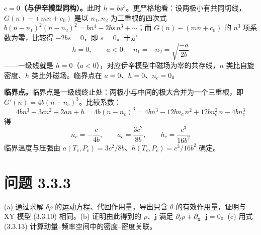 \textbf{$c=0$（与伊辛模型同构）。}此时 $h=bs^{3}$。更严格地看：设两极小有共同切线，$G(n)-(mn+c_0)$ 是以 $n_1,n_2$ 为二重根的四次式 $b(n-n_1)^{2}(n-n_2)^{2}=bn^{4}-2bs\,n^{3}+\cdots$；而 $G(n)-(mn+c_0)$ 的 $n^{3}$ 项系数为零，比较得 $-2bs=0$，即 $s=0$。于是
\begin{equation*}
h=0,\qquad a<0:\quad n_1=-n_2=\sqrt{\frac{-a}{2b}}
\end{equation*}
——一级线就是 $h=0$（$a<0$），对应伊辛模型中磁场为零的共存线，$n$ 类比自旋密度、$h$ 类比外磁场。临界点在 $a=0$、$h=0$、$n_c=0$。

\textbf{临界点。}临界点是一级线终止处：两极小与中间的极大合并为一个三重根，即 $G'(n)=4b(n-n_c)^{3}$。比较系数：
\begin{equation*}
4bn^{3}+3cn^{2}+2an+h=4b(n-n_c)^{3}
=4bn^{3}-12bn_c\,n^{2}+12bn_c^{2}\,n-4bn_c^{3}
\end{equation*}
得
\begin{equation*}
\boxed{\;n_c=-\frac{c}{4b},\qquad
a_c=\frac{3c^{2}}{8b},\qquad
h_c=\frac{c^{3}}{16b^{2}}\;}
\end{equation*}
临界温度与压强由 $a(T_c,P_c)=3c^{2}/8b$、$h(T_c,P_c)=c^{3}/16b^{2}$ 确定。

\section*{问题 3.3.3}
\begin{problem}
(a) 通过求解 $\delta\rho$ 的运动方程、代回作用量，导出只含 $\theta$ 的有效作用量，证明与 XY 模型 (3.3.10) 相同。(b) 证明由此得到的 $\rho$、$\pmb{j}$ 满足 $\partial_t\rho+\partial_{\pmb{x}}\cdot\pmb{j}=0$。(c) 用式 (3.3.13) 计算动量--频率空间中的密度--密度关联。
\end{problem}
\solution

